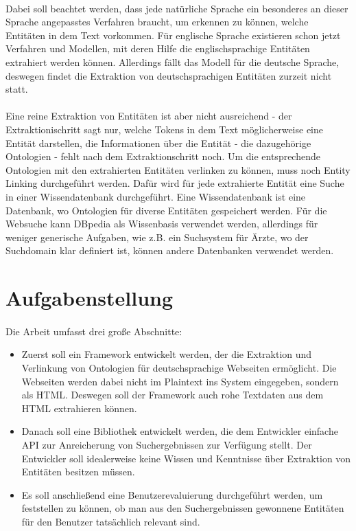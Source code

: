 \paragraph{}
Dabei soll beachtet werden, dass jede natürliche Sprache ein besonderes an dieser Sprache angepasstes Verfahren braucht, um erkennen zu können, welche Entitäten in dem Text vorkommen. Für englische Sprache existieren schon jetzt Verfahren und Modellen, mit deren Hilfe die englischsprachige Entitäten extrahiert werden können. Allerdings fällt das Modell für die deutsche Sprache, deswegen findet die Extraktion von deutschsprachigen Entitäten zurzeit nicht statt.

\paragraph{}
Eine reine Extraktion von Entitäten ist aber nicht ausreichend - der Extraktionischritt sagt nur, welche Tokens in dem Text möglicherweise eine Entität darstellen, die Informationen über die Entität - die dazugehörige Ontologien - fehlt nach dem Extraktionschritt noch. Um die entsprechende Ontologien mit den extrahierten Entitäten verlinken zu können, muss noch Entity Linking durchgeführt werden. Dafür wird für jede extrahierte Entität eine Suche in einer Wissendatenbank durchgeführt. Eine Wissendatenbank ist eine Datenbank, wo Ontologien für diverse Entitäten gespeichert werden. Für die Websuche kann DBpedia als Wissenbasis verwendet werden, allerdings für weniger generische Aufgaben, wie z.B. ein Suchsystem für Ärzte, wo der Suchdomain klar definiert ist, können andere Datenbanken verwendet werden.

\section{Aufgabenstellung}
\label{sec:Aufgabenstellung}
\paragraph{}
Die Arbeit umfasst drei große Abschnitte: 
\begin{itemize}
\item Zuerst soll ein Framework entwickelt werden, der die Extraktion und Verlinkung von Ontologien für deutschsprachige Webseiten ermöglicht. Die Webseiten werden dabei nicht im Plaintext ins System eingegeben, sondern als HTML. Deswegen soll der Framework auch rohe Textdaten aus dem HTML extrahieren können. 

\item Danach soll eine Bibliothek entwickelt werden, die dem Entwickler einfache API zur Anreicherung von Suchergebnissen zur Verfügung stellt. Der Entwickler soll idealerweise keine Wissen und Kenntnisse über Extraktion von Entitäten besitzen müssen.

\item Es soll anschließend eine Benutzerevaluierung durchgeführt werden, um feststellen zu können, ob man aus den Suchergebnissen gewonnene Entitäten für den Benutzer tatsächlich relevant sind.
\end{itemize}